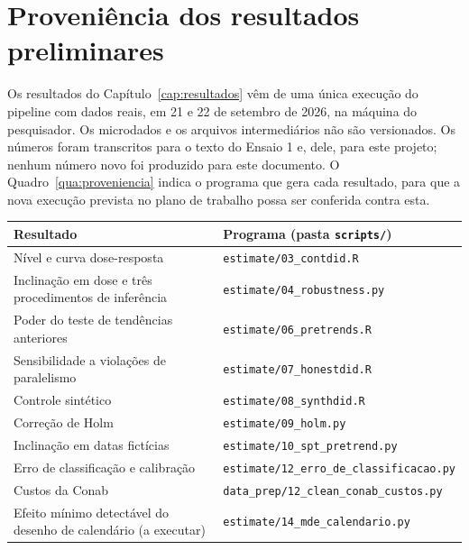 
\chapter{Proveniência dos resultados preliminares}
\label{ap:proveniencia}

Os resultados do Capítulo~\ref{cap:resultados} vêm de uma única execução do
pipeline com dados reais, em 21 e 22 de setembro de 2026, na máquina do
pesquisador. Os microdados e os arquivos intermediários não são versionados. Os
números foram transcritos para o texto do Ensaio 1 e, dele, para este projeto;
nenhum número novo foi produzido para este documento. O
Quadro~\ref{qua:proveniencia} indica o programa que gera cada resultado, para
que a nova execução prevista no plano de trabalho possa ser conferida contra
esta.

\begin{quadro}[htb]
\centering
\caption{Programa de origem de cada resultado}
\label{qua:proveniencia}
\small
\begin{tabular}{|p{6.4cm}|p{7.8cm}|}
\hline
\textbf{Resultado} & \textbf{Programa (pasta \texttt{scripts/})} \\
\hline
Nível e curva dose-resposta & \texttt{estimate/03\_contdid.R} \\
\hline
Inclinação em dose e três procedimentos de inferência &
  \texttt{estimate/04\_robustness.py} \\
\hline
Poder do teste de tendências anteriores & \texttt{estimate/06\_pretrends.R} \\
\hline
Sensibilidade a violações de paralelismo & \texttt{estimate/07\_honestdid.R} \\
\hline
Controle sintético & \texttt{estimate/08\_synthdid.R} \\
\hline
Correção de Holm & \texttt{estimate/09\_holm.py} \\
\hline
Inclinação em datas fictícias & \texttt{estimate/10\_spt\_pretrend.py} \\
\hline
Erro de classificação e calibração &
  \texttt{estimate/12\_erro\_de\_classificacao.py} \\
\hline
Custos da Conab & \texttt{data\_prep/12\_clean\_conab\_custos.py} \\
\hline
Efeito mínimo detectável do desenho de calendário (a executar) &
  \texttt{estimate/14\_mde\_calendario.py} \\
\hline
\end{tabular}
\end{quadro}
